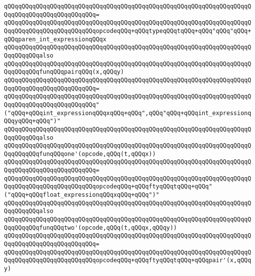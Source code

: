 \verb|qQQqqQQqqQQqqQQqqQQqqQQqqQQqqQQqqQQqqQQqqQQqqQQqqQQqqQQqqQQqqQQqqQQqqQQqqQQqqQQqqQQqqQQqqQQqqQQq=|\newline
\verb|qQQqqQQqqQQqqQQqqQQqqQQqqQQqqQQqqQQqqQQqqQQqqQQqqQQqqQQqqQQqqQQqqQQqqQQqqQQqqQQqqQQqqQQqqQQqqQQqopcodeqQQq+qQQqtypeqQQqtqQQq+qQQq"qQQq"qQQq+qQQqparen_int_expressionqQQqx|\newline
\newline
\verb|qQQqqQQqqQQqqQQqqQQqqQQqqQQqqQQqqQQqqQQqqQQqqQQqqQQqqQQqqQQqqQQqqQQqqQQqqQQqqQQqalso|\newline
\verb|qQQqqQQqqQQqqQQqqQQqqQQqqQQqqQQqqQQqqQQqqQQqqQQqqQQqqQQqqQQqqQQqqQQqqQQqqQQqqQQqfunqQQqpairqQQq(x,qQQqy)|\newline
\verb|qQQqqQQqqQQqqQQqqQQqqQQqqQQqqQQqqQQqqQQqqQQqqQQqqQQqqQQqqQQqqQQqqQQqqQQqqQQqqQQqqQQqqQQqqQQqqQQq=|\newline
\verb|qQQqqQQqqQQqqQQqqQQqqQQqqQQqqQQqqQQqqQQqqQQqqQQqqQQqqQQqqQQqqQQqqQQqqQQqqQQqqQQqqQQqqQQqqQQqqQQq"("qQQq+qQQqint_expressionqQQqxqQQq+qQQq",qQQq"qQQq+qQQqint_expressionqQQqyqQQq+qQQq")"|\newline
\newline
\verb|qQQqqQQqqQQqqQQqqQQqqQQqqQQqqQQqqQQqqQQqqQQqqQQqqQQqqQQqqQQqqQQqqQQqqQQqqQQqqQQqalso|\newline
\verb|qQQqqQQqqQQqqQQqqQQqqQQqqQQqqQQqqQQqqQQqqQQqqQQqqQQqqQQqqQQqqQQqqQQqqQQqqQQqqQQqfunqQQqone'(opcode,qQQq(t,qQQqx))|\newline
\verb|qQQqqQQqqQQqqQQqqQQqqQQqqQQqqQQqqQQqqQQqqQQqqQQqqQQqqQQqqQQqqQQqqQQqqQQqqQQqqQQqqQQqqQQqqQQqqQQq=|\newline
\verb|qQQqqQQqqQQqqQQqqQQqqQQqqQQqqQQqqQQqqQQqqQQqqQQqqQQqqQQqqQQqqQQqqQQqqQQqqQQqqQQqqQQqqQQqqQQqqQQqopcodeqQQq+qQQqftyqQQqtqQQq+qQQq"("qQQq+qQQqfloat_expressionqQQqxqQQq+qQQq")"|\newline
\newline
\verb|qQQqqQQqqQQqqQQqqQQqqQQqqQQqqQQqqQQqqQQqqQQqqQQqqQQqqQQqqQQqqQQqqQQqqQQqqQQqqQQqalso|\newline
\verb|qQQqqQQqqQQqqQQqqQQqqQQqqQQqqQQqqQQqqQQqqQQqqQQqqQQqqQQqqQQqqQQqqQQqqQQqqQQqqQQqfunqQQqtwo'(opcode,qQQq(t,qQQqx,qQQqy))|\newline
\verb|qQQqqQQqqQQqqQQqqQQqqQQqqQQqqQQqqQQqqQQqqQQqqQQqqQQqqQQqqQQqqQQqqQQqqQQqqQQqqQQqqQQqqQQqqQQqqQQq=|\newline
\verb|qQQqqQQqqQQqqQQqqQQqqQQqqQQqqQQqqQQqqQQqqQQqqQQqqQQqqQQqqQQqqQQqqQQqqQQqqQQqqQQqqQQqqQQqqQQqqQQqopcodeqQQq+qQQqftyqQQqtqQQq+qQQqpair'(x,qQQqy)|\newline
\newline
